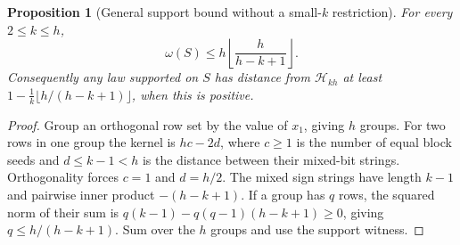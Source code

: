 \documentclass[11pt]{article}
\newtheorem{proposition}[theorem]{Proposition}
\begin{document}
\begin{proposition}[General support bound without a small-$k$ restriction]
\label{prop:design-plotkin-support}
For every $2\le k\le h$,
\[
 \omega(S)\le h\left\lfloor\frac{h}{h-k+1}\right\rfloor.
\]
Consequently any law supported on $S$ has distance from $\mathcal H_{kh}$
at least
$1-\frac1k\lfloor h/(h-k+1)\rfloor$, when this is positive.
\end{proposition}
\begin{proof}
Group an orthogonal row set by the value of $x_1$, giving $h$ groups.
For two rows in one group the kernel is $h c-2d$, where $c\ge1$ is
the number of equal block seeds and $d\le k-1<h$ is the distance
between their mixed-bit strings. Orthogonality forces $c=1$ and
$d=h/2$. The mixed sign strings have length $k-1$ and pairwise inner
product $-(h-k+1)$. If a group has $q$ rows, the squared norm of their
sum is $q(k-1)-q(q-1)(h-k+1)\ge0$, giving
$q\le h/(h-k+1)$. Sum over the $h$ groups and use the support witness.
\end{proof}
\end{document}
